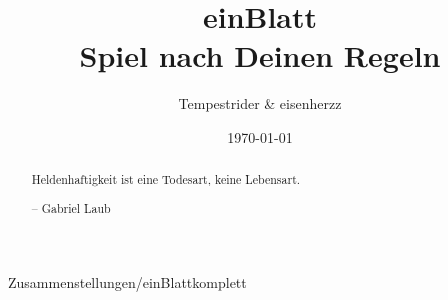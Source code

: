\documentclass[11pt,a4paper]{scrreprt}
\date{\today}
\author{Tempestrider \& eisenherzz}
\title{\pik \karo einBlatt\herz \kreuz \\
Spiel nach Deinen Regeln}
\begin{document}
\maketitle

\begin{abstract}
Heldenhaftigkeit ist eine Todesart, keine Lebensart.

-- Gabriel Laub

\end{abstract}




\tableofcontents

 {Zusammenstellungen/einBlattkomplett}

\listoftables


\end{document}
